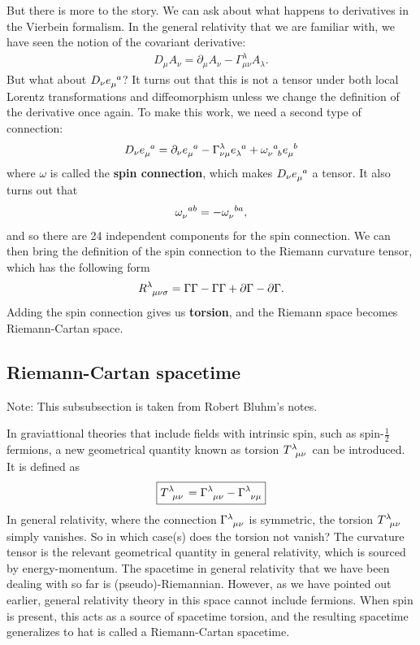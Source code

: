 \documentclass{book}
\numberwithin{equation}{section}
\theoremstyle{definition}
\newcommand{\p}{\partial}
\newcommand{\f}[2]{\frac{#1}{#2}}
\begin{document}
But there is more to the story. We can ask about what happens to derivatives in the Vierbein formalism. In the general relativity that we are familiar with, we have seen the notion of the covariant derivative:
\begin{align}
D_\mu A_\nu = \p_\mu A_\nu - \Gamma^\lambda_{\mu\nu}A_\lambda.
\end{align}
But what about $D_\nu \tensor{e}{_\mu^a}$? It turns out that this is not a tensor under both local Lorentz transformations and diffeomorphism unless we change the definition of the derivative once again. To make this work, we need a second type of connection:
\begin{align}
D_\nu \tensor{e}{_\mu^a} = \p_\nu \tensor{e}{_\mu^a} - \Gamma^\lambda_{\nu\mu}\tensor{e}{_\lambda^a} + \tensor{\omega}{_\nu^a_b}\tensor{e}{_\mu^b}
\end{align}
where $\omega$ is called the \textbf{spin connection}, which makes $D_\nu \tensor{e}{_\mu^a}$ a tensor. It also turns out that
\begin{align}
\tensor{\omega}{_\nu^{ab}} = -\tensor{\omega}{_\nu^{ba}},
\end{align}
and so there are 24 independent components for the spin connection. We can then bring the definition of the spin connection to the Riemann curvature tensor, which has the following form
\begin{align}
\tensor{R}{^\lambda_{\mu\nu\sigma}} = \Gamma\Gamma - \Gamma\Gamma + \p\Gamma - \p\Gamma.
\end{align}
Adding the spin connection gives us \textbf{torsion}, and the Riemann space becomes Riemann-Cartan space. 


\subsection{Riemann-Cartan spacetime}

Note: This subsubsection is taken from Robert Bluhm's notes.

In graviattional theories that include fields with intrinsic spin, such as spin-$\f{1}{2}$ fermions, a new geometrical quantity known as torsion $\tensor{T}{^\lambda_{\mu\nu}}$ can be introduced. It is defined as
\begin{align}
\boxed{\tensor{T}{^\lambda_{\mu\nu}} = \tensor{\Gamma}{^\lambda_{\mu\nu}} - \tensor{\Gamma}{^\lambda_{\nu\mu}}}
\end{align}
In general relativity, where the connection $\tensor{\Gamma}{^\lambda_{\mu\nu}}$ is symmetric, the torsion $\tensor{T}{^\lambda_{\mu\nu}}$ simply vanishes. So in which case(s) does the torsion not vanish? The curvature tensor is the relevant geometrical quantity in general relativity, which is sourced by energy-momentum. The spacetime in general relativity that we have been dealing with so far is (pseudo)-Riemannian. However, as we have pointed out earlier, general relativity theory in this space cannot include fermions. When spin is present, this acts as a source of spacetime torsion, and the resulting spacetime generalizes to hat is called a Riemann-Cartan spacetime.  
\end{document}
